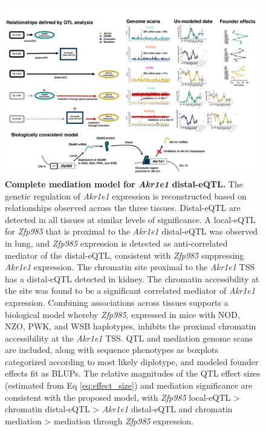 \documentclass[9pt,twocolumn,twoside]{gsajnl}
\begin{document}
\begin{figure}[hp]
\renewcommand{\familydefault}{\sfdefault}\normalfont
\centering
\includegraphics[width=\textwidth, trim={0in 0.1in 0in 0in}, clip]{figs/akr1e1_full_model_update.pdf}
\caption{\textbf{Complete mediation model for \textit{Akr1e1} distal-eQTL.}  The genetic regulation of \textit{Akr1e1} expression is reconstructed based on relationships observed across the three tissues. Distal-eQTL are detected in all tissues at similar levels of significance. A local-eQTL for \textit{Zfp985} that is proximal to the \textit{Akr1e1} distal-eQTL was observed in lung, and \textit{Zfp985} expression is detected as anti-correlated mediator of the distal-eQTL, consistent with \textit{Zfp985} suppressing \textit{Akr1e1} expression. The chromatin site proximal to the \textit{Akr1e1} TSS has a distal-cQTL detected in kidney. The chromatin accessibility at the site was found to be a significant correlated mediator of \textit{Akr1e1} expression. Combining associations across tissues supports a biological model whereby \textit{Zfp985}, expressed in mice with NOD, NZO, PWK, and WSB haplotypes, inhibits the proximal chromatin accessibility at the \textit{Akr1e1} TSS. QTL and mediation genome scans are included, along with sequence phenotypes as boxplots categorized according to most likely diplotype, and modeled founder effects fit as BLUPs. The relative magnitudes of the QTL effect sizes (estimated from Eq \ref{eq:effect_size}) and mediation significance are consistent with the proposed model, with \textit{Zfp985} local-eQTL > chromatin distal-eQTL > \textit{Akr1e1} distal-eQTL and chromatin mediation > mediation through \textit{Zfp985} expression.
\label{fig:akr1e1_full_model}}
\end{figure}
\end{document}

